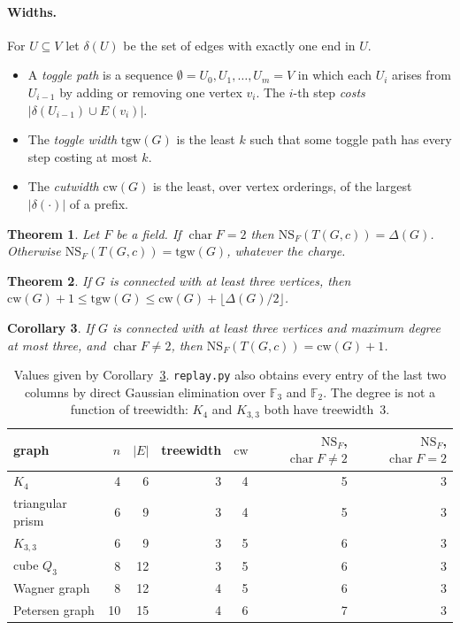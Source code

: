 \documentclass[11pt]{article}
\newtheorem{theorem}{Theorem}
\newtheorem{corollary}[theorem]{Corollary}
\theoremstyle{definition}
\theoremstyle{remark}
\newcommand{\NS}{\mathrm{NS}}
\newcommand{\tgw}{\mathrm{tgw}}
\newcommand{\cw}{\mathrm{cw}}
\newcommand{\ch}{\operatorname{char}}
\begin{document}
\paragraph{Widths.} For $U\subseteq V$ let $\delta(U)$ be the set of edges with
exactly one end in $U$.
\begin{itemize}
\item A \emph{toggle path} is a sequence
$\emptyset=U_0,U_1,\dots,U_m=V$ in which each $U_i$ arises from $U_{i-1}$ by
adding or removing one vertex $v_i$. The $i$-th step \emph{costs}
$|\delta(U_{i-1})\cup E(v_i)|$.
\item The \emph{toggle width} $\tgw(G)$ is the least $k$ such that some toggle
path has every step costing at most $k$.
\item The \emph{cutwidth} $\cw(G)$ is the least, over vertex orderings, of the
largest $|\delta(\cdot)|$ of a prefix.
\end{itemize}

\begin{theorem}\label{thm:main}
Let $F$ be a field. If $\ch F=2$ then $\NS_F(T(G,c))=\Delta(G)$. Otherwise
$\NS_F(T(G,c))=\tgw(G)$, whatever the charge.
\end{theorem}

\begin{theorem}\label{thm:width}
If $G$ is connected with at least three vertices, then
$\cw(G)+1\le\tgw(G)\le\cw(G)+\lfloor\Delta(G)/2\rfloor$.
\end{theorem}

\begin{corollary}\label{cor:cubic}
If $G$ is connected with at least three vertices and maximum degree at most
three, and $\ch F\ne2$, then $\NS_F(T(G,c))=\cw(G)+1$.
\end{corollary}

\begin{table}[h]
\centering
\begin{tabular}{lrrrrrr}
\toprule
graph & $n$ & $|E|$ & treewidth & $\cw$ & $\NS_F$, $\ch F\ne2$ & $\NS_F$, $\ch F=2$\\
\midrule
$K_4$ & 4 & 6 & 3 & 4 & 5 & 3\\
triangular prism & 6 & 9 & 3 & 4 & 5 & 3\\
$K_{3,3}$ & 6 & 9 & 3 & 5 & 6 & 3\\
cube $Q_3$ & 8 & 12 & 3 & 5 & 6 & 3\\
Wagner graph & 8 & 12 & 4 & 5 & 6 & 3\\
Petersen graph & 10 & 15 & 4 & 6 & 7 & 3\\
\bottomrule
\end{tabular}
\caption{Values given by Corollary~\ref{cor:cubic}. \texttt{replay.py} also
obtains every entry of the last two columns by direct Gaussian elimination
over $\mathbb F_3$ and $\mathbb F_2$. The degree is not a function of
treewidth: $K_4$ and $K_{3,3}$ both have treewidth~$3$.}
\label{tab:values}
\end{table}
\end{document}
